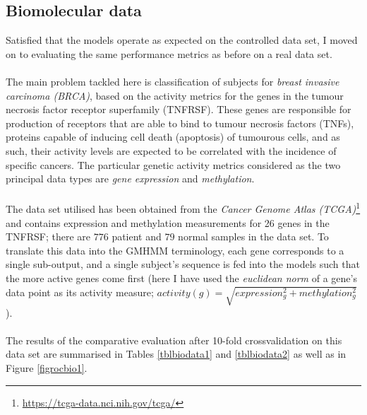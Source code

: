 \documentclass[12pt,a4paper,twoside,openright]{report}
\begin{document}
\subsection{Biomolecular data}\label{secBiomoldata}

Satisfied that the models operate as expected on the controlled data set, I moved on to evaluating the same performance metrics as before on a real data set.\\ \\
The main problem tackled here is classification of subjects for \emph{breast invasive carcinoma (BRCA)}, based on the activity metrics for the genes in the tumour necrosis factor receptor superfamily (TNFRSF). These genes are responsible for production of receptors that are able to bind to tumour necrosis factors (TNFs), proteins capable of inducing cell death (apoptosis) of tumourous cells, and as such, their activity levels are expected to be correlated with the incidence of specific cancers. The particular genetic activity metrics considered as the two principal data types are \emph{gene expression} and \emph{methylation}.\\ \\
The data set utilised has been obtained from the \emph{Cancer Genome Atlas (TCGA)}\footnote{\url{https://tcga-data.nci.nih.gov/tcga/}} and contains expression and methylation measurements for 26 genes in the TNFRSF; there are $776$ patient and $79$ normal samples in the data set. To translate this data into the GMHMM terminology, each gene corresponds to a single sub-output, and a single subject's sequence is fed into the models such that the more active genes come first (here I have used the \emph{euclidean norm} of a gene's data point as its activity measure; $activity(g) = \sqrt{expression_g^2 + methylation_g^2}$).\\ \\
The results of the comparative evaluation after 10-fold crossvalidation on this data set are summarised in Tables \ref{tblbiodata1} and \ref{tblbiodata2} as well as in Figure \ref{figrocbio1}.%
\end{document}
